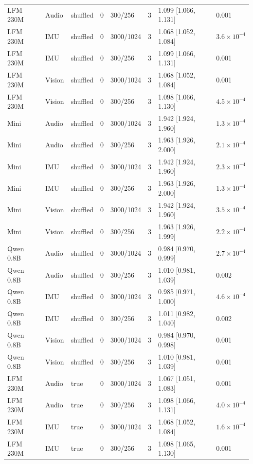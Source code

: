 {\begin{longtable}{@{}llllllll@{}}
LFM 230M & Audio & shuffled & 0 & 300/256 & 3 & 1.099 [1.066, 1.131] & 0.001 \\
LFM 230M & IMU & shuffled & 0 & 3000/1024 & 3 & 1.068 [1.052, 1.084] & $3.6\times10^{-4}$ \\
LFM 230M & IMU & shuffled & 0 & 300/256 & 3 & 1.099 [1.066, 1.131] & 0.001 \\
LFM 230M & Vision & shuffled & 0 & 3000/1024 & 3 & 1.068 [1.052, 1.084] & 0.001 \\
LFM 230M & Vision & shuffled & 0 & 300/256 & 3 & 1.098 [1.066, 1.130] & $4.5\times10^{-4}$ \\
Mini & Audio & shuffled & 0 & 3000/1024 & 3 & 1.942 [1.924, 1.960] & $1.3\times10^{-4}$ \\
Mini & Audio & shuffled & 0 & 300/256 & 3 & 1.963 [1.926, 2.000] & $2.1\times10^{-4}$ \\
Mini & IMU & shuffled & 0 & 3000/1024 & 3 & 1.942 [1.924, 1.960] & $2.3\times10^{-4}$ \\
Mini & IMU & shuffled & 0 & 300/256 & 3 & 1.963 [1.926, 2.000] & $1.3\times10^{-4}$ \\
Mini & Vision & shuffled & 0 & 3000/1024 & 3 & 1.942 [1.924, 1.960] & $3.5\times10^{-4}$ \\
Mini & Vision & shuffled & 0 & 300/256 & 3 & 1.963 [1.926, 1.999] & $2.2\times10^{-4}$ \\
Qwen 0.8B & Audio & shuffled & 0 & 3000/1024 & 3 & 0.984 [0.970, 0.999] & $2.7\times10^{-4}$ \\
Qwen 0.8B & Audio & shuffled & 0 & 300/256 & 3 & 1.010 [0.981, 1.039] & 0.002 \\
Qwen 0.8B & IMU & shuffled & 0 & 3000/1024 & 3 & 0.985 [0.971, 1.000] & $4.6\times10^{-4}$ \\
Qwen 0.8B & IMU & shuffled & 0 & 300/256 & 3 & 1.011 [0.982, 1.040] & 0.002 \\
Qwen 0.8B & Vision & shuffled & 0 & 3000/1024 & 3 & 0.984 [0.970, 0.998] & 0.001 \\
Qwen 0.8B & Vision & shuffled & 0 & 300/256 & 3 & 1.010 [0.981, 1.039] & 0.001 \\
LFM 230M & Audio & true & 0 & 3000/1024 & 3 & 1.067 [1.051, 1.083] & 0.001 \\
LFM 230M & Audio & true & 0 & 300/256 & 3 & 1.098 [1.066, 1.131] & $4.0\times10^{-4}$ \\
LFM 230M & IMU & true & 0 & 3000/1024 & 3 & 1.068 [1.052, 1.084] & $1.6\times10^{-4}$ \\
LFM 230M & IMU & true & 0 & 300/256 & 3 & 1.098 [1.065, 1.130] & 0.001 \\

\end{longtable}}

